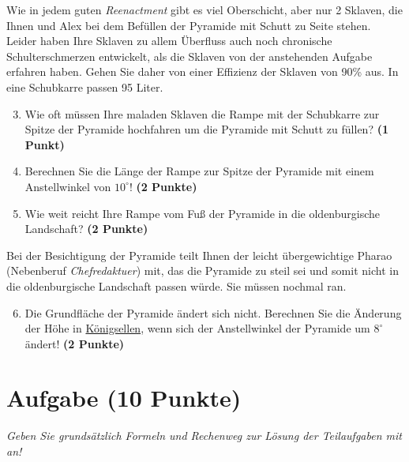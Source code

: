 \documentclass[a4paper, 9pt]{scrartcl}\usepackage[]{graphicx}\usepackage[]{xcolor}
\begin{document}
Wie in jedem guten \textit{Reenactment} gibt es viel Oberschicht, aber nur 2 Sklaven, die Ihnen und Alex bei dem Befüllen der Pyramide mit Schutt zu Seite stehen. Leider haben Ihre Sklaven zu allem Überfluss auch noch chronische Schulterschmerzen entwickelt, als die Sklaven von der anstehenden Aufgabe erfahren haben. Gehen Sie daher von einer Effizienz der Sklaven von 90\% aus. In eine Schubkarre passen 95 Liter.

\begin{enumerate}
  \setcounter{enumi}{2}
\item Wie oft müssen Ihre maladen Sklaven die Rampe mit der Schubkarre zur Spitze der Pyramide hochfahren um die Pyramide mit Schutt zu füllen? \textbf{(1 Punkt)}
\item Berechnen Sie die Länge der Rampe zur Spitze der Pyramide mit einem Anstellwinkel von $10^\circ$! \textbf{(2 Punkte)}
\item Wie weit reicht Ihre Rampe vom Fuß der Pyramide in die oldenburgische Landschaft?  \textbf{(2 Punkte)}
\end{enumerate}

Bei der Besichtigung der Pyramide teilt Ihnen der leicht übergewichtige Pharao (Nebenberuf \textit{Chefredaktuer}) mit, das die Pyramide zu steil sei und somit nicht in die oldenburgische Landschaft passen würde. Sie müssen nochmal ran.

\begin{enumerate}
  \setcounter{enumi}{5}
\item Die Grundfläche der Pyramide ändert sich nicht. Berechnen Sie die Änderung der Höhe in \underline{Königsellen}, wenn sich der Anstellwinkel der Pyramide um $8^\circ$ ändert!  \textbf{(2 Punkte)}
\end{enumerate}



\clearpage

\section{Aufgabe \hfill (10 Punkte)}

\textit{Geben Sie grundsätzlich Formeln und Rechenweg zur Lösung der Teilaufgaben mit an!} \\[1Ex]
 
\end{document}
